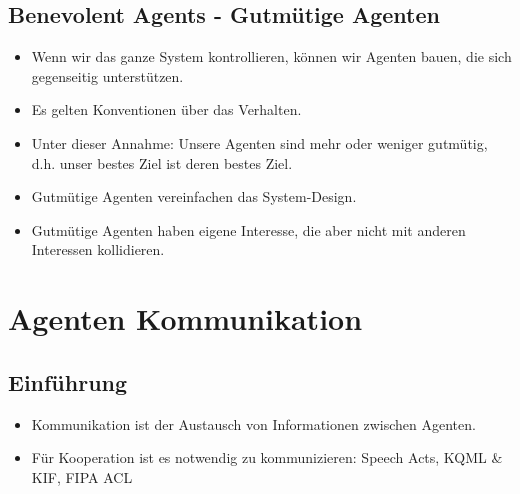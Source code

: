 \documentclass{article} %
\begin{document}
	\subsection{Benevolent Agents - Gutmütige Agenten}
	\begin{itemize}
		\item Wenn wir das ganze System kontrollieren, können wir Agenten bauen, die sich gegenseitig unterstützen.
		\item Es gelten Konventionen über das Verhalten.
		\item Unter dieser Annahme: Unsere Agenten sind mehr oder weniger gutmütig, d.h. unser bestes Ziel ist deren bestes Ziel.
		\item Gutmütige Agenten vereinfachen das System-Design.
		\item Gutmütige Agenten haben eigene Interesse, die aber nicht mit anderen Interessen kollidieren.
	\end{itemize}
\section{Agenten Kommunikation}
	\subsection{Einführung}
	\begin{itemize}
		\item Kommunikation ist der Austausch von Informationen zwischen Agenten.
		\item Für Kooperation ist es notwendig zu kommunizieren: Speech Acts, KQML \& KIF, FIPA ACL
	\end{itemize}
\end{document}
